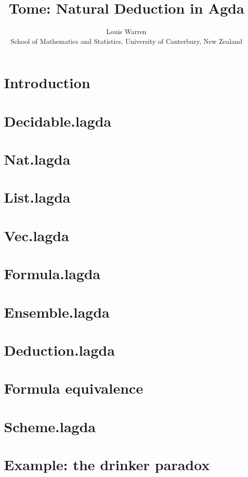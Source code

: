 \documentclass{article}
\begin{document}
\title{Tome: Natural Deduction in Agda}
\author{
Louis Warren \\
School of Mathematics and Statistics, University of Canterbury, New Zealand
}
\date{}
\maketitle

\tableofcontents

\section{Introduction}


\section{Decidable.lagda}


\section{Nat.lagda}


\section{List.lagda}


\section{Vec.lagda}


\section{Formula.lagda}


\section{Ensemble.lagda}


\section{Deduction.lagda}


\section{Formula equivalence}


\section{Scheme.lagda}


\section{Example: the drinker paradox}


{}

\end{document}
